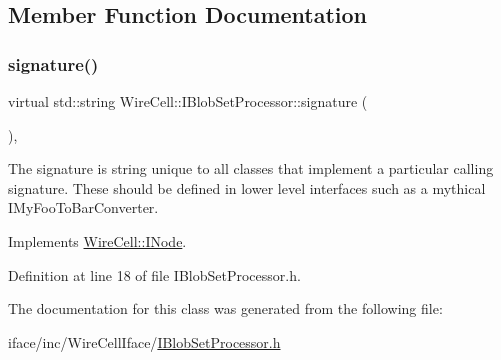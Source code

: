 \subsection{Member Function Documentation}
\mbox{\label{class_wire_cell_1_1_i_blob_set_processor_a387452d24275fc0ff7d5530ac7b96d85}} 
\subsubsection{\texorpdfstring{signature()}{signature()}}
{\footnotesize\ttfamily virtual std\+::string Wire\+Cell\+::\+I\+Blob\+Set\+Processor\+::signature (\begin{DoxyParamCaption}{ }\end{DoxyParamCaption})\hspace{0.3cm}{\ttfamily [inline]}, {\ttfamily [virtual]}}

The signature is string unique to all classes that implement a particular calling signature. These should be defined in lower level interfaces such as a mythical I\+My\+Foo\+To\+Bar\+Converter. 

Implements \hyperlink{class_wire_cell_1_1_i_node_a0b0763465adf5ba7febe8e378162b584}{Wire\+Cell\+::\+I\+Node}.



Definition at line 18 of file I\+Blob\+Set\+Processor.\+h.



The documentation for this class was generated from the following file\+:\begin{DoxyCompactItemize}
\item 
iface/inc/\+Wire\+Cell\+Iface/\hyperlink{_i_blob_set_processor_8h}{I\+Blob\+Set\+Processor.\+h}\end{DoxyCompactItemize}
